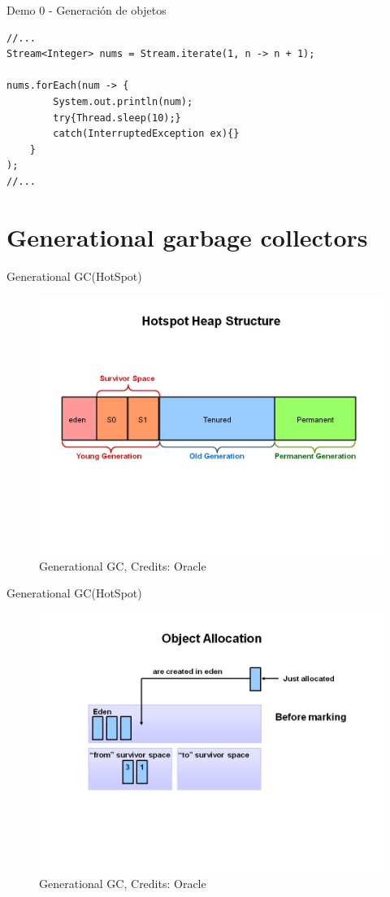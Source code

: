 \documentclass{beamer}
\begin{document}
\begin{frame}[fragile]{Demo 0 - Generación de objetos}
\begin{lstlisting}
//...
Stream<Integer> nums = Stream.iterate(1, n -> n + 1);

nums.forEach(num -> {
		System.out.println(num);
		try{Thread.sleep(10);}
		catch(InterruptedException ex){}
	}
);
//...
\end{lstlisting}
\end{frame}

\section{Generational garbage collectors}

\begin{frame}{Generational GC(HotSpot)}
\begin{figure}
	\centering
	\includegraphics[width=0.9\linewidth]{Images/generational}
	\caption{Generational GC, Credits: Oracle}
\end{figure}
\end{frame}

\begin{frame}{Generational GC(HotSpot)}
\begin{figure}
	\centering
	\includegraphics[width=0.9\linewidth]{Images/generational1}
	\caption{Generational GC, Credits: Oracle}
\end{figure}
\end{frame}
\end{document}
